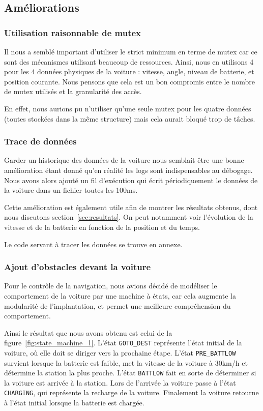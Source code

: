 \documentclass[conference]{IEEEtran}
\begin{document}
\subsection{Améliorations}

\subsubsection{Utilisation raisonnable de mutex}

Il nous a semblé important d'utiliser le strict minimum en terme de mutex car ce sont des
mécanismes utilisant beaucoup de ressources. Ainsi, nous en utilisons 4 pour les 4 données
physiques de la voiture : vitesse, angle, niveau de batterie, et position courante. Nous
pensons que cela est un bon compromis entre le nombre de mutex utilisés et la granularité
des accès. 

En effet, nous aurions pu n'utiliser qu'une seule mutex pour les quatre données (toutes
stockées dans la même structure) mais cela aurait bloqué trop de tâches.

\subsubsection{Trace de données}

Garder un historique des données de la voiture nous semblait être une bonne amélioration
étant donné qu'en réalité les logs sont indispensables au débogage. Nous avons alors
ajouté un fil d'exécution qui écrit périodiquement le données de la voiture dans un
fichier toutes les 100ms.

Cette amélioration est également utile afin de montrer les résultats obtenus, dont nous
discutons section~\ref{sec:resultats}. On peut notamment voir l'évolution de la vitesse et
de la batterie en fonction de la position et du temps.

Le code servant à tracer les données se trouve en annexe.

\subsubsection{Ajout d'obstacles devant la voiture}

Pour le contrôle de la navigation, nous avions décidé de modéliser le comportement de la
voiture par une machine à états, car cela augmente la modularité de l'implantation, et
permet une meilleure compréhension du comportement.

Ainsi le résultat que nous avons obtenu est celui de la figure~\ref{fig:state_machine_1}. 
L'état \texttt{GOTO\_DEST} représente l'état initial de la voiture, où elle doit se
diriger vers la prochaine étape. L'état \texttt{PRE\_BATTLOW} survient lorsque la batterie
est faible, met la vitesse de la voiture à 30km/h et détermine la station la plus proche.
L'état \texttt{BATTLOW} fait en sorte de déterminer si la voiture est arrivée à la
station. Lors de l'arrivée la voiture passe à l'état \texttt{CHARGING}, qui représente la
recharge de la voiture. Finalement la voiture retourne à l'état initial lorsque la
batterie est chargée.
\end{document}
